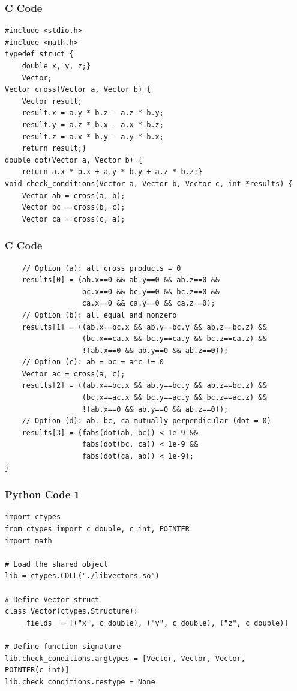 \documentclass{beamer}
\begin{document}
\begin{frame}[fragile]
    \frametitle{C Code}
    \begin{lstlisting}
#include <stdio.h>
#include <math.h>
typedef struct {
    double x, y, z;} 
    Vector;
Vector cross(Vector a, Vector b) {
    Vector result;
    result.x = a.y * b.z - a.z * b.y;
    result.y = a.z * b.x - a.x * b.z;
    result.z = a.x * b.y - a.y * b.x;
    return result;}
double dot(Vector a, Vector b) {
    return a.x * b.x + a.y * b.y + a.z * b.z;}
void check_conditions(Vector a, Vector b, Vector c, int *results) {
    Vector ab = cross(a, b);
    Vector bc = cross(b, c);
    Vector ca = cross(c, a);
    \end{lstlisting}
\end{frame}

\begin{frame}[fragile]
    \frametitle{C Code}
    \begin{lstlisting}
    // Option (a): all cross products = 0
    results[0] = (ab.x==0 && ab.y==0 && ab.z==0 &&
                  bc.x==0 && bc.y==0 && bc.z==0 &&
                  ca.x==0 && ca.y==0 && ca.z==0);
    // Option (b): all equal and nonzero
    results[1] = ((ab.x==bc.x && ab.y==bc.y && ab.z==bc.z) &&
                  (bc.x==ca.x && bc.y==ca.y && bc.z==ca.z) &&
                  !(ab.x==0 && ab.y==0 && ab.z==0));
    // Option (c): ab = bc = a*c != 0
    Vector ac = cross(a, c);
    results[2] = ((ab.x==bc.x && ab.y==bc.y && ab.z==bc.z) &&
                  (bc.x==ac.x && bc.y==ac.y && bc.z==ac.z) &&
                  !(ab.x==0 && ab.y==0 && ab.z==0));
    // Option (d): ab, bc, ca mutually perpendicular (dot = 0)
    results[3] = (fabs(dot(ab, bc)) < 1e-9 &&
                  fabs(dot(bc, ca)) < 1e-9 &&
                  fabs(dot(ca, ab)) < 1e-9);
}
    \end{lstlisting}
\end{frame}

\begin{frame}[fragile]
    \frametitle{Python Code 1}
    \begin{lstlisting}
import ctypes
from ctypes import c_double, c_int, POINTER
import math

# Load the shared object
lib = ctypes.CDLL("./libvectors.so")

# Define Vector struct
class Vector(ctypes.Structure):
    _fields_ = [("x", c_double), ("y", c_double), ("z", c_double)]

# Define function signature
lib.check_conditions.argtypes = [Vector, Vector, Vector, POINTER(c_int)]
lib.check_conditions.restype = None
    \end{lstlisting}
\end{frame}
\end{document}
